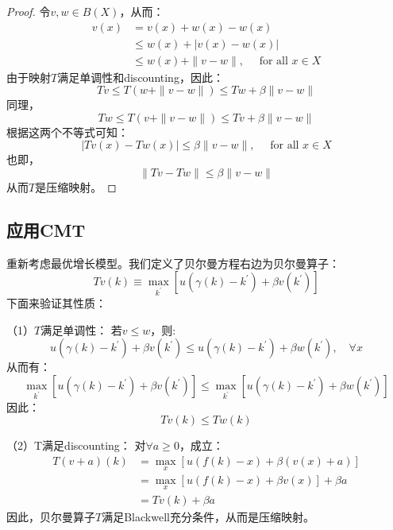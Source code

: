\begin{proof}
    令$v, w \in B(X)$，从而：
    $$
    \begin{aligned}
        v(x) & =v(x)+w(x)-w(x) \\
        & \leq w(x)+|v(x)-w(x)| \\
        & \leq w(x)+\|v-w\|, \quad \text { for all } x \in X
    \end{aligned}
    $$
    由于映射$T$满足单调性和discounting，因此：
    $$
    T v \leq T(w+\|v-w\|) \leq T w+\beta\|v-w\|
    $$
    同理，
    $$
    T w \leq T(v+\|v-w\|) \leq T v+\beta\|v-w\|
    $$
    根据这两个不等式可知：
    $$
    |T v(x)-T w(x)| \leq \beta\|v-w\|, \quad \text { for all } x \in X
    $$
    也即，
    $$
    \|T v-T w\| \leq \beta\|v-w\|
    $$
    从而$T$是压缩映射。
\end{proof}


\subsection{应用CMT}

重新考虑最优增长模型。我们定义了贝尔曼方程右边为贝尔曼算子：
\begin{equation*}
    Tv\left(k\right) \equiv \max_{k^{\prime}} \left[u\left(\gamma\left(k\right)-k^{\prime}\right)
        +\beta v\left(k^{\prime}\right)\right]
\end{equation*}
下面来验证其性质：

（1）$T$满足单调性：
若$v \leq w$，则:
$$
u\left(\gamma\left(k\right)-k^{\prime}\right)+\beta v\left(k^{\prime}\right) \leq 
    u\left(\gamma\left(k\right)-k^{\prime}\right)+\beta w\left(k^{\prime}\right), \quad \forall x
$$
从而有：
$$
    \max _{k^{\prime}}\left[u\left(\gamma\left(k\right)-k^{\prime}\right)+\beta v\left(k^{\prime}\right)\right] \leq 
    \max _{k^{\prime}}\left[u\left(\gamma\left(k\right)-k^{\prime}\right)+\beta w\left(k^{\prime}\right)\right]
$$
因此：
$$Tv\left(k\right)\leq Tw\left(k\right)$$

（2）T满足discounting：
对$\forall a \geq 0$，成立：
\begin{equation*}
    \begin{aligned}
        T(v+a)(k) & =\max _x[u(f(k)-x)+\beta(v(x)+a)] \\
            & =\max _x[u(f(k)-x)+\beta v(x)]+\beta a \\
            & =T v(k)+\beta a
    \end{aligned}
\end{equation*}
因此，贝尔曼算子$T$满足Blackwell充分条件，从而是压缩映射。

